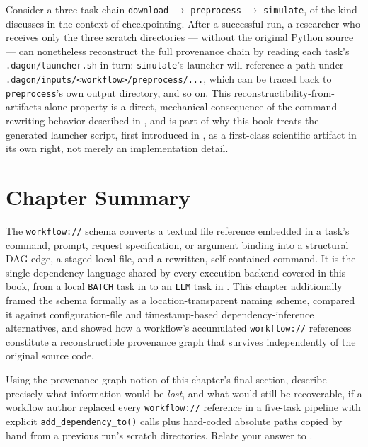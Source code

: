 \begin{example}
Consider a three-task chain \texttt{download} $\to$ \texttt{preprocess}
$\to$ \texttt{simulate}, of the kind  discusses in
the context of checkpointing. After a successful run, a researcher who
receives only the three scratch directories --- without the original Python
source --- can nonetheless reconstruct the full provenance chain by reading
each task's \texttt{.dagon/launcher.sh} in turn: \texttt{simulate}'s
launcher will reference a path under
\texttt{.dagon/inputs/<workflow>/preprocess/...}, which can be traced back
to \texttt{preprocess}'s own output directory, and so on. This
reconstructibility-from-artifacts-alone property is a direct, mechanical
consequence of the command-rewriting behavior described in ,
and is part of why this book treats the generated launcher script, first
introduced in , as a first-class scientific
artifact in its own right, not merely an implementation detail.
\end{example}

\section{Chapter Summary}

The \texttt{workflow://} schema converts a textual file reference embedded in
a task's command, prompt, request specification, or argument binding into a
structural DAG edge, a staged local file, and a rewritten, self-contained
command. It is the single dependency language shared by every execution
backend covered in this book, from a local \texttt{BATCH} task in
 to an \texttt{LLM} task in . This
chapter additionally framed the schema formally as a location-transparent
naming scheme, compared it against configuration-file and timestamp-based
dependency-inference alternatives, and showed how a workflow's accumulated
\texttt{workflow://} references constitute a reconstructible provenance
graph that survives independently of the original source code.

\begin{exercise}
Using the provenance-graph notion of this chapter's final section, describe
precisely what information would be \emph{lost}, and what would still be
recoverable, if a workflow author replaced every \texttt{workflow://}
reference in a five-task pipeline with explicit \texttt{add\_dependency\_to()}
calls plus hard-coded absolute paths copied by hand from a previous run's
scratch directories. Relate your answer to .
\end{exercise}
